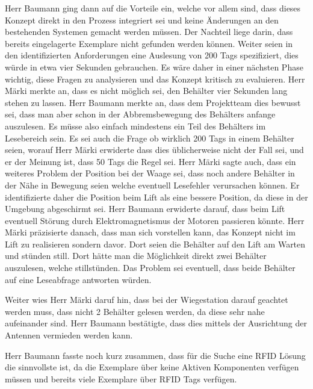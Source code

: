 \documentclass[parskip=full, a4paper]{scrreprt}
\begin{document}
Herr Baumann ging dann auf die Vorteile ein, welche vor allem sind, dass dieses Konzept direkt in den Prozess integriert sei und keine Änderungen an den bestehenden Systemen gemacht werden müssen. Der Nachteil liege darin, dass bereits eingelagerte Exemplare nicht gefunden werden können. Weiter seien in den identifizierten Anforderungen eine Auslesung von 200 Tags spezifiziert, dies würde in etwa vier Sekunden gebrauchen. Es wäre daher in einer nächsten Phase wichtig, diese Fragen zu analysieren und das Konzept kritisch zu evaluieren. Herr Märki merkte an, dass es nicht möglich sei, den Behälter vier Sekunden lang stehen zu lassen. Herr Baumann merkte an, dass dem Projektteam dies bewusst sei, dass man aber schon in der Abbremsbewegung des Behälters anfange auszulesen. Es müsse also einfach mindestens ein Teil des Behälters im Lesebereich sein. Es sei auch die Frage ob wirklich 200 Tags in einem Behälter seien, worauf Herr Märki erwiderte dass dies üblicherweise nicht der Fall sei, und er der Meinung ist, dass 50 Tags die Regel sei. Herr Märki sagte auch, dass ein weiteres Problem der Position bei der Waage sei, dass noch andere Behälter in der Nähe in Bewegung seien welche eventuell Lesefehler verursachen können. Er identifizierte daher die Position beim Lift als eine bessere Position, da diese in der Umgebung abgeschirmt sei. Herr Baumann erwiderte darauf, dass beim Lift eventuell Störung durch Elektromagnetismus der Motoren passieren könnte. Herr Märki präzisierte danach, dass man sich vorstellen kann, das Konzept nicht im Lift zu realisieren sondern davor. Dort seien die Behälter auf den Lift am Warten und stünden still. Dort hätte man die Möglichkeit direkt zwei Behälter auszulesen, welche stillstünden. Das Problem sei eventuell, dass beide Behälter auf eine Leseabfrage antworten würden.

Weiter wies Herr Märki daruf hin, dass bei der Wiegestation darauf geachtet werden muss, dass nicht 2 Behälter gelesen werden, da diese sehr nahe aufeinander sind. Herr Baumann bestätigte, dass dies mittels der Ausrichtung der Antennen vermieden werden kann.


Herr Baumann fasste noch kurz zusammen, dass für die Suche eine RFID Lösung die sinnvollste ist, da die Exemplare über keine Aktiven Komponenten verfügen müssen und bereits viele Exemplare über RFID Tags verfügen.
\end{document}
